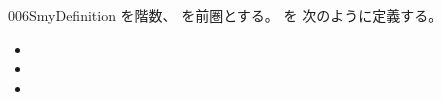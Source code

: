 \documentclass[index]{subfiles}
\begin{document}
\begin{myBlock}{006S}{myDefinition}
  を階数、
  を前圏とする。
  を
  次のように定義する。
  \begin{itemize}
  \item {}
  \item {}
  \item {}
  \end{itemize}
\end{myBlock}
\end{document}
